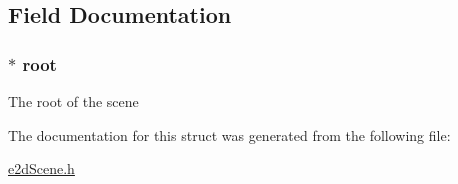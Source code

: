 \subsection{Field Documentation}
\hypertarget{structe2dScene_aa5444ac46bf18449921a4094bcadde1c}{
\subsubsection[{root}]{$\ast$ {\bf root}}}\label{structe2dScene_aa5444ac46bf18449921a4094bcadde1c}
The root of the scene 

The documentation for this struct was generated from the following file\-:\begin{DoxyCompactItemize}
\item 
\hyperlink{e2dScene_8h}{e2d\-Scene.\-h}\end{DoxyCompactItemize}
